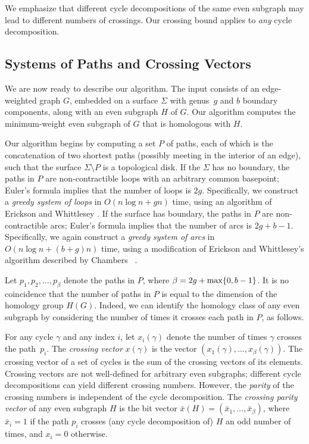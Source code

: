 \documentclass{sig-alternate}
\begin{document}
We emphasize that different cycle decompositions of the same even subgraph may lead to different numbers of crossings.  Our crossing bound applies to \emph{any} cycle decomposition.

\subsection{Systems of Paths and Crossing Vectors}

We are now ready to describe our algorithm.  The input consists of an edge-weighted graph $G$, embedded on a surface $\Sigma$ with genus~$g$ and $b$ boundary components, along with an even subgraph $H$ of $G$.  Our algorithm computes the minimum-weight even subgraph of $G$ that is homologous with $H$.

Our algorithm begins by computing a set $P$ of paths, each of which is the concatenation of two shortest paths (possibly meeting in the interior of an edge), such that the surface $\Sigma\setminus P$ is a topological disk.  If the $\Sigma$ has no boundary, the paths in $P$ are non-contractible loops with an arbitrary common basepoint; Euler's formula implies that the number of loops is $2g$.  Specifically, we construct a \emph{greedy system of loops} in $O(n\log n + gn)$ time, using an algorithm of Erickson and Whittlesey \cite{ew-gohhg-05}.  If the surface has boundary, the paths in $P$ are non-contractible arcs; Euler's formula implies that the number of arcs is $2g+b-1$.  Specifically, we again construct a \emph{greedy system of arcs} in $O(n\log n + (b+g)n)$ time, using a modification of Erickson and Whittlesey's algorithm described by Chambers \etal~\cite{ccelw-scsih-08}.

Let $p_1, p_2, \dots, p_\beta$ denote the paths in $P$, where $\beta = 2g + \max\{ 0,b-1 \}$.  It is no coincidence that the number of paths in $P$ is equal to the dimension of the homology group $H(G)$.  Indeed, we can identify the homology class of any even subgraph by considering the number of times it crosses each path in $P$, as follows.

For any cycle $\gamma$ and any index $i$, let $x_i(\gamma)$ denote the number of times $\gamma$ crosses the path~$p_i$.  The \emph{crossing vector} $x(\gamma)$ is the vector $(x_1(\gamma), \dots, x_\beta(\gamma))$.  The crossing vector of a set of cycles is the sum of the crossing vectors of its elements.  Crossing vectors are not well-defined for arbitrary even subgraphs; different cycle decompositions can yield different crossing numbers.  However, the \emph{parity} of the crossing numbers is independent of the cycle decomposition.  The \emph{crossing parity vector} of any even subgraph $H$ is the bit vector $\bar{x}(H) = (\bar{x}_1, \dots, \bar{x}_\beta)$, where $\bar{x}_i = 1$ if the path $p_i$ crosses (any cycle decomposition of) $H$ an odd number of times, and $x_i = 0$ otherwise.
\end{document}
